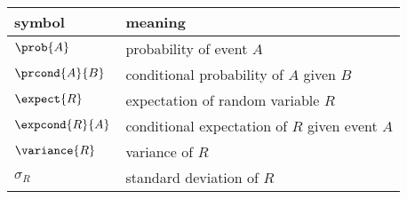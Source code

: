 \begin{center}
\begin{tabular}{ll}
symbol         &  meaning\\
\hline
$\prob{A}$     & probability of event $A$\\
$\prcond{A}{B}$ & conditional probability of $A$ given $B$\\
$\expect{R}$   & expectation of random variable $R$\\
$\expcond{R}{A}$ & conditional expectation of $R$ given event $A$\\
$\variance{R}$ & variance of $R$\\
$\sigma_R$     & standard deviation of $R$
\end{tabular}
\end{center}
